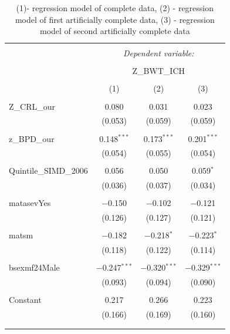 \documentclass[bsc]{abdnthesis}
\begin{document}
\begin{table}[H] \centering 
  \caption{(1)- regression model of complete data, (2) - regression model of first artificially complete data, (3) - regression model of second artificially complete data} 
  \label{abdn-models} 
\begin{tabular}{@{\extracolsep{5pt}}lccc} 
\\[-1.8ex]\hline 
\hline \\[-1.8ex] 
 & \multicolumn{3}{c}{\textit{Dependent variable:}} \\ 
\cline{2-4} 
\\[-1.8ex] & \multicolumn{3}{c}{Z\_BWT\_ICH} \\ 
\\[-1.8ex] & (1) & (2) & (3)\\ 
\hline \\[-1.8ex] 
 Z\_CRL\_our & 0.080 & 0.031 & 0.023 \\ 
  & (0.053) & (0.059) & (0.059) \\ 
  & & & \\ 
 z\_BPD\_our & 0.148$^{***}$ & 0.173$^{***}$ & 0.201$^{***}$ \\ 
  & (0.054) & (0.055) & (0.054) \\ 
  & & & \\ 
 Quintile\_SIMD\_2006 & 0.056 & 0.050 & 0.059$^{*}$ \\ 
  & (0.036) & (0.037) & (0.034) \\ 
  & & & \\ 
 matasevYes & $-$0.150 & $-$0.102 & $-$0.121 \\ 
  & (0.126) & (0.127) & (0.121) \\ 
  & & & \\ 
 matsm & $-$0.182 & $-$0.218$^{*}$ & $-$0.223$^{*}$ \\ 
  & (0.118) & (0.122) & (0.114) \\ 
  & & & \\ 
 bsexmf24Male & $-$0.247$^{***}$ & $-$0.320$^{***}$ & $-$0.329$^{***}$ \\ 
  & (0.093)  & (0.094) & (0.090) \\ 
  & & & \\ 
 Constant & 0.217 & 0.266 & 0.223 \\ 
  & (0.166) & (0.169) & (0.160) \\ 
  & & & \\ 
\hline \\[-1.8ex] 

\end{tabular}
\end{table}
\end{document}

